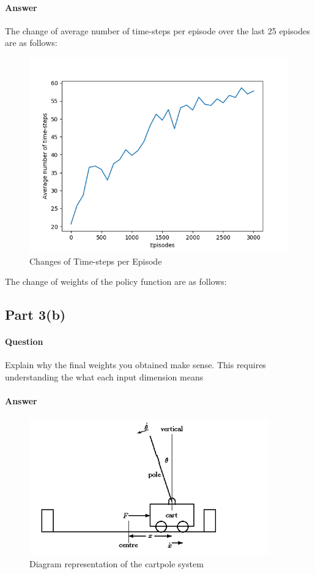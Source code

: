 \documentclass[11pt,twoside]{article}
\begin{document}
\paragraph{Answer}
The change of average number of time-steps per episode over the last 25 episodes are as follows:
\begin{figure}[h]
	\centering
	\includegraphics[scale=1]{part3a.png}
	\caption*{Changes of Time-steps per Episode}
\end{figure}

The change of weights of the policy function are as follows:
\begingroup
\obeylines
%
\endgroup%
\subsection*{Part 3(b)}
\paragraph{Question}
Explain why the final weights you obtained make sense. This requires understanding the what each input dimension means

\paragraph{Answer}

\begin{figure}[h]
	\centering
	\includegraphics[scale=2.0]{cartpole_image.png}
	\caption*{Diagram representation of the cartpole system}
\end{figure}
\end{document}
